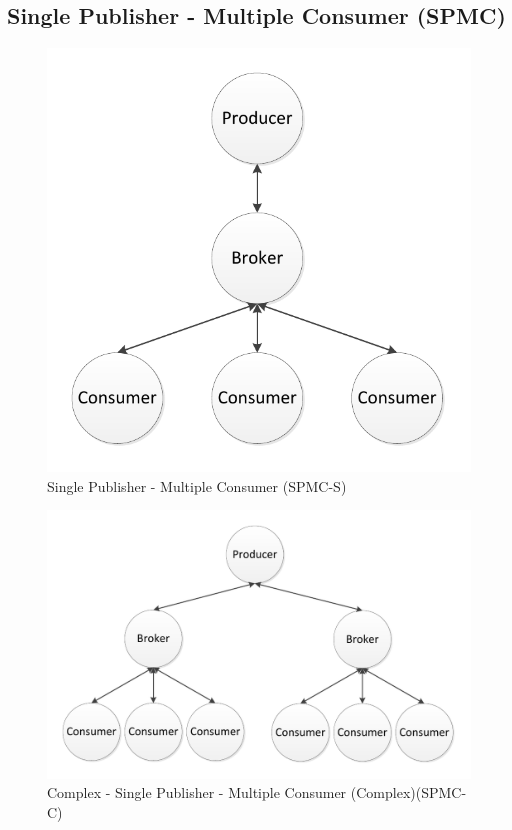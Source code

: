 \documentclass{thesis}
\begin{document}
\subsection{Single Publisher - Multiple Consumer (SPMC)}

\begin{figure}
\centering
\vspace{2.0in} 
\includegraphics{simple_fanout}  
\caption{Single Publisher - Multiple Consumer (SPMC-S)}
\label{Figure 3}  
\end{figure}

\begin{figure}
\centering
\vspace{2.0in} 
\includegraphics{complicated_fanout}  
\caption{Complex - Single Publisher - Multiple Consumer (Complex)(SPMC-C)}
\label{Figure 4}  
\end{figure}
\end{document}
